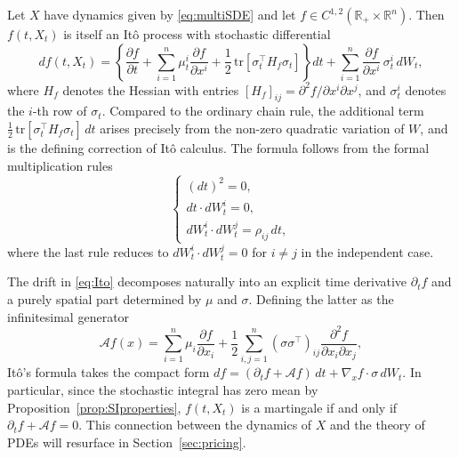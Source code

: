 \begin{theorem}
Let $X$ have dynamics given by \eqref{eq:multiSDE} and let 
$f \in C^{1,2}(\mathbb{R}_+ \times \mathbb{R}^n)$. Then $f(t,X_t)$ 
is itself an Itô process with stochastic differential
\begin{equation}
    df(t,X_t) = \left\{
        \frac{\partial f}{\partial t}
        + \sum_{i=1}^n \mu_t^i \frac{\partial f}{\partial x^i}
        + \frac{1}{2}\,\mathrm{tr}\!\left[\sigma_t^\top H_f \sigma_t\right]
    \right\}dt
    + \sum_{i=1}^n \frac{\partial f}{\partial x^i}\,\sigma_t^i\,dW_t,
\end{equation}
where $H_f$ denotes the Hessian with entries 
$[H_f]_{ij} = \partial^2 f / \partial x^i \partial x^j$, and $\sigma_t^i$ 
denotes the $i$-th row of $\sigma_t$. Compared to the ordinary chain 
rule, the additional term $\frac{1}{2}\,\mathrm{tr}[\sigma_t^\top H_f 
\sigma_t]\,dt$ arises precisely from the non-zero quadratic variation 
of $W$, and is the defining correction of Itô calculus. The formula 
follows from the formal multiplication rules
\begin{equation}
\begin{cases}
    (dt)^2 = 0,\\
    dt \cdot dW^i_t = 0,\\
    dW^i_t \cdot dW^j_t = \rho_{ij}\,dt,
\end{cases}
\end{equation}
where the last rule reduces to $dW^i_t \cdot dW^j_t = 0$ for $i \neq j$ 
in the independent case.
\end{theorem}

\begin{remark}
The drift in \eqref{eq:Ito} decomposes naturally into an explicit time 
derivative $\partial_t f$ and a purely spatial part determined by 
$\mu$ and $\sigma$. Defining the latter as the infinitesimal generator
\begin{equation}
    \mathcal{A}f(x) = \sum_{i=1}^n \mu_i\frac{\partial f}{\partial x_i}
    + \frac{1}{2}\sum_{i,j=1}^n (\sigma\sigma^\top)_{ij}
    \frac{\partial^2 f}{\partial x_i \partial x_j},
\end{equation}
Itô's formula takes the compact form 
$df = (\partial_t f + \mathcal{A}f)\,dt + \nabla_x f \cdot \sigma\,dW_t$.
In particular, since the stochastic integral has zero mean by 
Proposition~\ref{prop:SIproperties}, $f(t,X_t)$ is a martingale if and 
only if $\partial_t f + \mathcal{A}f = 0$. This connection between the 
dynamics of $X$ and the theory of PDEs will resurface in 
Section~\ref{sec:pricing}.
\end{remark}



